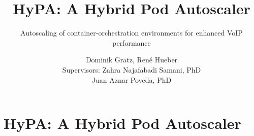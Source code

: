 \documentclass[11pt,t,usepdftitle=false,aspectratio=169]{beamer}
\title[HyPA]{HyPA: A Hybrid Pod Autoscaler}
\subtitle{Autoscaling of container-orchestration environments for enhanced VoIP performance}
\author[Dominik Gratz \& René Hueber]{Dominik Gratz, René Hueber\\[3mm]{\small Supervisors: Zahra Najafabadi Samani, PhD \\ \hspace{20mm} Juan Aznar Poveda, PhD}}
\begin{document}



\section{HyPA: A Hybrid Pod Autoscaler}
\end{document}

